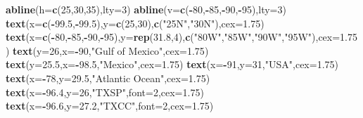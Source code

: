 \documentclass[]{article}
\newenvironment{Shaded}{\begin{snugshade}}{\end{snugshade}}
\newcommand{\KeywordTok}[1]{\textcolor[rgb]{0.13,0.29,0.53}{\textbf{#1}}}
\newcommand{\DataTypeTok}[1]{\textcolor[rgb]{0.13,0.29,0.53}{#1}}
\newcommand{\DecValTok}[1]{\textcolor[rgb]{0.00,0.00,0.81}{#1}}
\newcommand{\FloatTok}[1]{\textcolor[rgb]{0.00,0.00,0.81}{#1}}
\newcommand{\StringTok}[1]{\textcolor[rgb]{0.31,0.60,0.02}{#1}}
\newcommand{\OperatorTok}[1]{\textcolor[rgb]{0.81,0.36,0.00}{\textbf{#1}}}
\newcommand{\NormalTok}[1]{#1}
\begin{document}
\begin{Shaded}
\begin{Highlighting}[]
\KeywordTok{abline}\NormalTok{(}\DataTypeTok{h=}\KeywordTok{c}\NormalTok{(}\DecValTok{25}\NormalTok{,}\DecValTok{30}\NormalTok{,}\DecValTok{35}\NormalTok{),}\DataTypeTok{lty=}\DecValTok{3}\NormalTok{)}
\KeywordTok{abline}\NormalTok{(}\DataTypeTok{v=}\KeywordTok{c}\NormalTok{(}\OperatorTok{-}\DecValTok{80}\NormalTok{,}\OperatorTok{-}\DecValTok{85}\NormalTok{,}\OperatorTok{-}\DecValTok{90}\NormalTok{,}\OperatorTok{-}\DecValTok{95}\NormalTok{),}\DataTypeTok{lty=}\DecValTok{3}\NormalTok{)}
\KeywordTok{text}\NormalTok{(}\DataTypeTok{x=}\KeywordTok{c}\NormalTok{(}\OperatorTok{-}\FloatTok{99.5}\NormalTok{,}\OperatorTok{-}\FloatTok{99.5}\NormalTok{),}\DataTypeTok{y=}\KeywordTok{c}\NormalTok{(}\DecValTok{25}\NormalTok{,}\DecValTok{30}\NormalTok{),}\KeywordTok{c}\NormalTok{(}\StringTok{"25N"}\NormalTok{,}\StringTok{"30N"}\NormalTok{),}\DataTypeTok{cex=}\FloatTok{1.75}\NormalTok{)}
\KeywordTok{text}\NormalTok{(}\DataTypeTok{x=}\KeywordTok{c}\NormalTok{(}\OperatorTok{-}\DecValTok{80}\NormalTok{,}\OperatorTok{-}\DecValTok{85}\NormalTok{,}\OperatorTok{-}\DecValTok{90}\NormalTok{,}\OperatorTok{-}\DecValTok{95}\NormalTok{),}\DataTypeTok{y=}\KeywordTok{rep}\NormalTok{(}\FloatTok{31.8}\NormalTok{,}\DecValTok{4}\NormalTok{),}\KeywordTok{c}\NormalTok{(}\StringTok{"80W"}\NormalTok{,}\StringTok{"85W"}\NormalTok{,}\StringTok{"90W"}\NormalTok{,}\StringTok{"95W"}\NormalTok{),}\DataTypeTok{cex=}\FloatTok{1.75}\NormalTok{)}
\KeywordTok{text}\NormalTok{(}\DataTypeTok{y=}\DecValTok{26}\NormalTok{,}\DataTypeTok{x=}\OperatorTok{-}\DecValTok{90}\NormalTok{,}\StringTok{"Gulf of Mexico"}\NormalTok{,}\DataTypeTok{cex=}\FloatTok{1.75}\NormalTok{)}
\KeywordTok{text}\NormalTok{(}\DataTypeTok{y=}\FloatTok{25.5}\NormalTok{,}\DataTypeTok{x=}\OperatorTok{-}\FloatTok{98.5}\NormalTok{,}\StringTok{"Mexico"}\NormalTok{,}\DataTypeTok{cex=}\FloatTok{1.75}\NormalTok{)}
\KeywordTok{text}\NormalTok{(}\DataTypeTok{x=}\OperatorTok{-}\DecValTok{91}\NormalTok{,}\DataTypeTok{y=}\DecValTok{31}\NormalTok{,}\StringTok{"USA"}\NormalTok{,}\DataTypeTok{cex=}\FloatTok{1.75}\NormalTok{)}
\KeywordTok{text}\NormalTok{(}\DataTypeTok{x=}\OperatorTok{-}\DecValTok{78}\NormalTok{,}\DataTypeTok{y=}\FloatTok{29.5}\NormalTok{,}\StringTok{"Atlantic Ocean"}\NormalTok{,}\DataTypeTok{cex=}\FloatTok{1.75}\NormalTok{)}
\KeywordTok{text}\NormalTok{(}\DataTypeTok{x=}\OperatorTok{-}\FloatTok{96.4}\NormalTok{,}\DataTypeTok{y=}\DecValTok{26}\NormalTok{,}\StringTok{"TXSP"}\NormalTok{,}\DataTypeTok{font=}\DecValTok{2}\NormalTok{,}\DataTypeTok{cex=}\FloatTok{1.75}\NormalTok{)}
\KeywordTok{text}\NormalTok{(}\DataTypeTok{x=}\OperatorTok{-}\FloatTok{96.6}\NormalTok{,}\DataTypeTok{y=}\FloatTok{27.2}\NormalTok{,}\StringTok{"TXCC"}\NormalTok{,}\DataTypeTok{font=}\DecValTok{2}\NormalTok{,}\DataTypeTok{cex=}\FloatTok{1.75}\NormalTok{)}

\end{Highlighting}
\end{Shaded}
\end{document}
